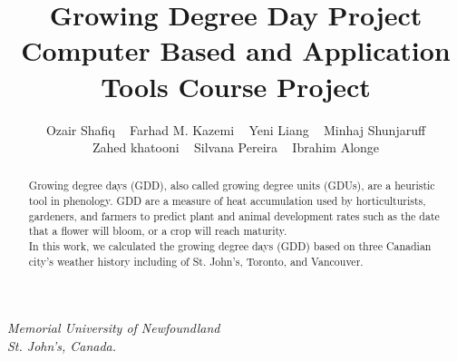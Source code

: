 \documentclass[12pt,letterpaper]{article}
\begin{document}
{\centering
\title{Growing Degree Day Project \\ \vspace{.5 cm} {\Large Computer Based and Application Tools Course Project} }
\maketitle
\author{Ozair Shafiq ~ Farhad M. Kazemi ~ Yeni Liang ~ Minhaj Shunjaruff \\ Zahed khatooni ~  Silvana Pereira ~  Ibrahim Alonge}

{\itshape Memorial University of Newfoundland \\ St. John's, Canada.\par}
}
\begin{abstract}
Growing degree days (GDD), also called growing degree units (GDUs), are a heuristic tool in phenology. GDD are a measure of heat accumulation used by horticulturists, gardeners, and farmers to predict plant and animal development rates such as the date that a flower will bloom, or a crop will reach maturity.
\\
In this work, we calculated the growing degree days (GDD) based on three Canadian city's weather history including of St. John's, Toronto, and Vancouver.
\end{abstract}
\end{document}
